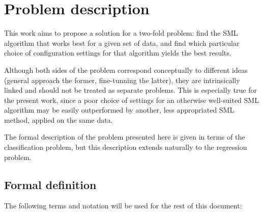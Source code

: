 \chapter{Problem description}

	This work aims to propose a solution for a two-fold problem: find the SML algorithm that works
	best for a given set of data, and find which particular choice of configuration settings for
	that algorithm yields the best results.
	
	Although both sides of the problem correspond conceptually to different ideas (general approach
	the former, fine-tunning the latter), they are intrinsically linked and should not be treated as
	separate problems. This is especially true for the present work, since a poor choice of
	settings for an otherwise well-suited SML algorithm may be easily outperformed by another, less
	appropriated SML method, applied on the same data.

	The formal description of the problem presented here is given in terms of the classification
	problem, but this description extends naturally to the regression problem.

	\section{Formal definition}

	The following terms and notation will be used for the rest of this document:

